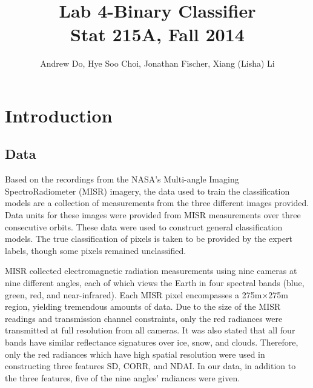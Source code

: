 \documentclass{article}\usepackage[]{graphicx}\usepackage[]{color}
\begin{document}
\title{Lab 4-Binary Classifier\\
Stat 215A, Fall 2014}

\author{Andrew Do, Hye Soo Choi, Jonathan Fischer, Xiang (Lisha) Li }

\maketitle
\section{Introduction}
\subsection{Data} Based on the recordings from the NASA's Multi-angle Imaging SpectroRadiometer (MISR) imagery, the data used to train the classification models are a collection of measurements from the three different images provided. Data units for these images were provided from MISR measurements over three consecutive orbits. These data were used to construct general classification models. The true classification of pixels is taken to be provided by the expert labels, though some pixels remained unclassified.

MISR collected electromagnetic radiation measurements using nine cameras at nine different angles, each of which views the Earth in four spectral bands (blue, green, red, and near-infrared).  Each MISR pixel encompasses a 275m$\times$275m region, yielding tremendous amounts of data. Due to the size of the MISR readings and transmission channel constraints, only the red radiances were transmitted at full resolution from all cameras. It was also stated that all four bands have similar reflectance signatures over ice, snow, and clouds. Therefore, only the red radiances which have high spatial resolution were used in constructing three features SD, CORR, and NDAI.  In our data, in addition to the three features, five of the nine angles' radiances were given.
\end{document}
